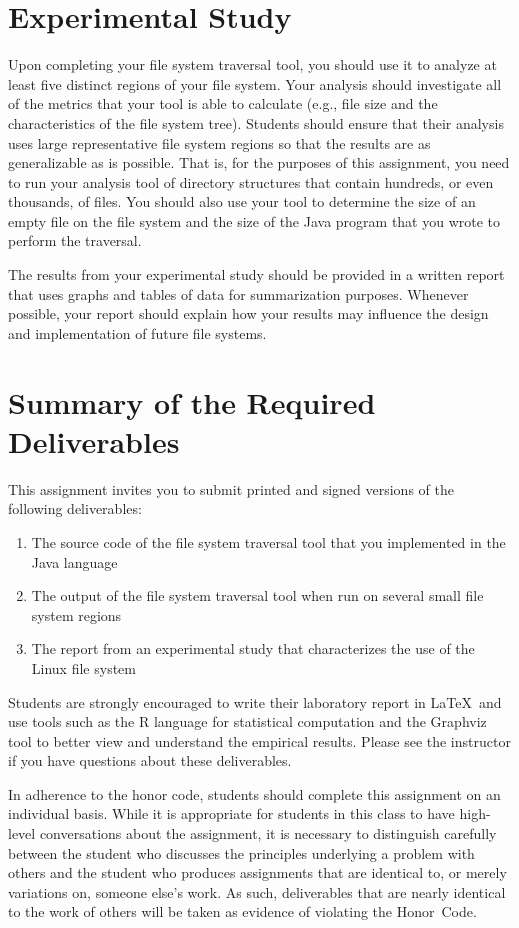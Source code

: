 \section*{Experimental Study}

Upon completing your file system traversal tool, you should use it to analyze at least five distinct regions of your file system.
Your analysis should investigate all of the metrics that your tool is able to calculate (e.g., file size and the characteristics
of the file system tree). Students should ensure that their analysis uses large representative file system regions so that the results
are as generalizable as is possible. That is, for the purposes of this assignment, you need to run your analysis tool of directory
structures that contain hundreds, or even thousands, of files. You should also use your tool to determine the size of an empty
file on the file system and the size of the Java program that you wrote to perform the traversal.

The results from your experimental study should be provided in a written report that uses graphs and tables of data for
summarization purposes. Whenever possible, your report should explain how your results may influence the design and implementation
of future file systems.

\section*{Summary of the Required Deliverables}

This assignment invites you to submit printed and signed versions of the following deliverables: 

\begin{enumerate}
  \item The source code of the file system traversal tool that you implemented in the Java language
  \item The output of the file system traversal tool when run on several small file system regions
  \item The report from an experimental study that characterizes the use of the Linux file system
\end{enumerate}

Students are strongly encouraged to write their laboratory report in \LaTeX~and use tools such as the R language for statistical
computation and the Graphviz tool to better view and understand the empirical results. Please see the instructor if you have
questions about these deliverables.

In adherence to the honor code, students should complete this assignment on an individual basis. While it is appropriate for
students in this class to have high-level conversations about the assignment, it is necessary to distinguish carefully between the
student who discusses the principles underlying a problem with others and the student who produces assignments that are identical
to, or merely variations on, someone else's work.  As such, deliverables that are nearly identical to the work of others will be
taken as evidence of violating the \mbox{Honor Code}.  



  
